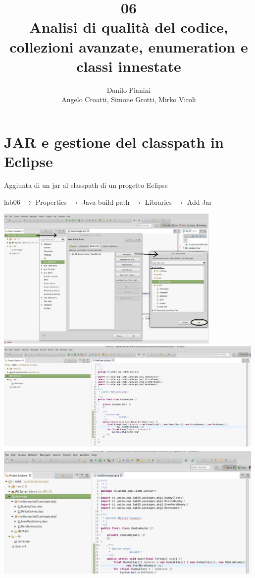 \documentclass[presentation]{beamer}
\author[Pianini]{Danilo Pianini\\Angelo Croatti, Simone Grotti, Mirko Viroli}
\title[L06 -- Advanced Collections]{06\\ Analisi di qualità del codice, collezioni avanzate, enumeration e classi innestate}
\begin{document}
	
\frame[label=coverpage]{\titlepage}

\newcommand{\al}[0]{\textless}
\newcommand{\ar}[0]{\textgreater}
\newcommand{\gen}[1]{\al{}#1\ar{}}
\newcommand{\imgfr}[4]{\fr{#1}{#2
\begin{center}
\texttt{[image: \#4]}                    
\end{center}
}}

\section{JAR e gestione del classpath in Eclipse}

\begin{frame}[allowframebreaks]{Aggiunta di un jar al classpath di un progetto Eclipse}
	\begin{block}{}
		lab06 $\rightarrow$ Properties $\rightarrow$ Java build path $\rightarrow$ Libraries $\rightarrow$ Add Jar
	\end{block}
	\begin{center}
		\includegraphics[width=0.82\textwidth]{img/addjar-1} \\
		\includegraphics[width=0.99\textwidth]{img/addjar-2} \\
		\includegraphics[width=0.99\textwidth]{img/addjar-3} \\

\end{center}
\end{frame}
\end{document}
